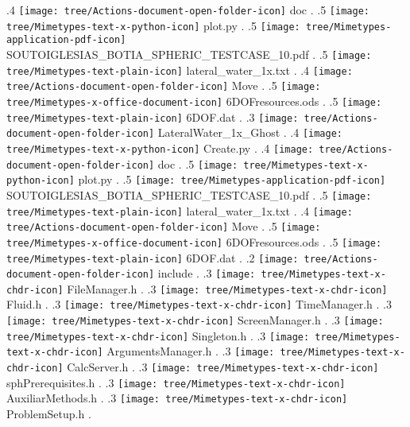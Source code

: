 {.4 { \texttt{[image: tree/Actions-document-open-folder-icon]} doc }.
.5 { \texttt{[image: tree/Mimetypes-text-x-python-icon]} plot.py }.
.5 { \texttt{[image: tree/Mimetypes-application-pdf-icon]} SOUTOIGLESIAS\_BOTIA\_SPHERIC\_TESTCASE\_10.pdf }.
.5 { \texttt{[image: tree/Mimetypes-text-plain-icon]} lateral\_water\_1x.txt }.
.4 { \texttt{[image: tree/Actions-document-open-folder-icon]} Move }.
.5 { \texttt{[image: tree/Mimetypes-x-office-document-icon]} 6DOFresources.ods }.
.5 { \texttt{[image: tree/Mimetypes-text-plain-icon]} 6DOF.dat }.
.3 { \texttt{[image: tree/Actions-document-open-folder-icon]} LateralWater\_1x\_Ghost }.
.4 { \texttt{[image: tree/Mimetypes-text-x-python-icon]} Create.py }.
.4 { \texttt{[image: tree/Actions-document-open-folder-icon]} doc }.
.5 { \texttt{[image: tree/Mimetypes-text-x-python-icon]} plot.py }.
.5 { \texttt{[image: tree/Mimetypes-application-pdf-icon]} SOUTOIGLESIAS\_BOTIA\_SPHERIC\_TESTCASE\_10.pdf }.
.5 { \texttt{[image: tree/Mimetypes-text-plain-icon]} lateral\_water\_1x.txt }.
.4 { \texttt{[image: tree/Actions-document-open-folder-icon]} Move }.
.5 { \texttt{[image: tree/Mimetypes-x-office-document-icon]} 6DOFresources.ods }.
.5 { \texttt{[image: tree/Mimetypes-text-plain-icon]} 6DOF.dat }.
.2 { \texttt{[image: tree/Actions-document-open-folder-icon]} include }.
.3 { \texttt{[image: tree/Mimetypes-text-x-chdr-icon]} FileManager.h }.
.3 { \texttt{[image: tree/Mimetypes-text-x-chdr-icon]} Fluid.h }.
.3 { \texttt{[image: tree/Mimetypes-text-x-chdr-icon]} TimeManager.h }.
.3 { \texttt{[image: tree/Mimetypes-text-x-chdr-icon]} ScreenManager.h }.
.3 { \texttt{[image: tree/Mimetypes-text-x-chdr-icon]} Singleton.h }.
.3 { \texttt{[image: tree/Mimetypes-text-x-chdr-icon]} ArgumentsManager.h }.
.3 { \texttt{[image: tree/Mimetypes-text-x-chdr-icon]} CalcServer.h }.
.3 { \texttt{[image: tree/Mimetypes-text-x-chdr-icon]} sphPrerequisites.h }.
.3 { \texttt{[image: tree/Mimetypes-text-x-chdr-icon]} AuxiliarMethods.h }.
.3 { \texttt{[image: tree/Mimetypes-text-x-chdr-icon]} ProblemSetup.h }.
}
